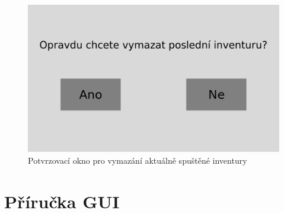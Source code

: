 \begin{figure}[H]
    \begin{center}
        \includegraphics[scale=0.4]{obrazky/GUI Vymazání inventury.png}
    \end{center}
    \caption{Potvrzovací okno pro vymazání aktuálně spuštěné inventury}
    \label{Potvrzovací okno pro vymazání aktuálně spuštěné inventury}
\end{figure}



\chapter{Příručka GUI}
